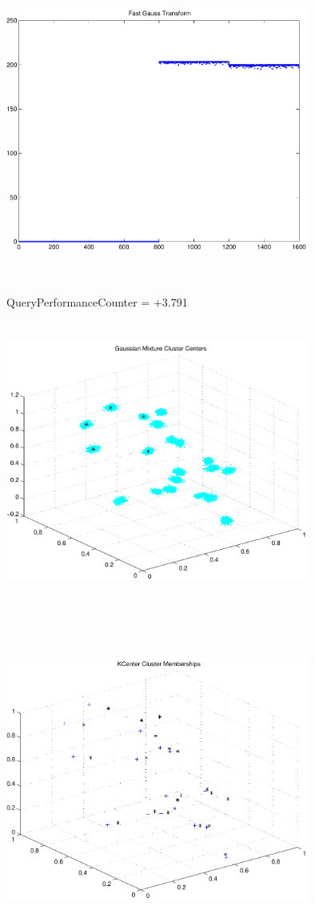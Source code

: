 \documentclass[9pt]{article}
\theoremstyle{plain}
\theoremstyle{definition}
\theoremstyle{remark}
\numberwithin{equation}{section}
\begin{document}
\includegraphics[width=10.0cm,height=10.0cm]{FGT4_Centers.pdf}

QueryPerformanceCounter  =  +3.791
\includegraphics[width=10.0cm,height=10.0cm]{GaussianMixture_ClusterCenters20_Centers.pdf}

\includegraphics[width=10.0cm,height=10.0cm]{KCenterClusterMemberships_20_Centers.pdf}
\end{document}
